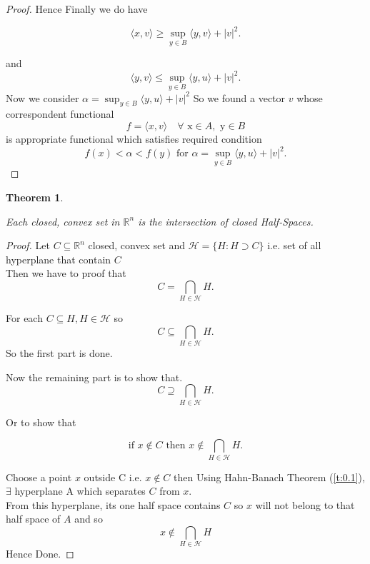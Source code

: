 \documentclass[oneside]{book}
\newtheorem{theorem}{Theorem}[section]
\begin{document}
\begin{proof}
		Hence Finally we do have 
		
		\begin{equation}
		\label{eq4.2}
		\langle x, v \rangle \geqslant\sup_{y\in B}\langle y, v\rangle+|v|^{2}.
		\end{equation}
		
		
		and 
		\begin{equation}
		\langle y, v\rangle  \leqslant \sup _{y \in B}\langle y, u\rangle + |v|^{2}.
		\end{equation}
		Now we consider  $\alpha =  \sup _{y \in B}\langle y, u\rangle + |v|^{2}$ 
		So we found a vector $v$ whose \\
		correspondent functional 
		\\ $$f = \langle x, v\rangle \quad  
		\forall \text{ x} \in A, \text{ y} \in B $$ is 
		appropriate functional which satisfies required condition 
		$$f(x)< \alpha < f(y)
		\text{ for } 
		\alpha =  \sup _{y \in B}\langle y, u\rangle + |v|^{2}.$$
	\end{proof}
	
	
	
	
	
	
	\begin{theorem}
		\label{t:0.2}
		
		Each closed, convex set in  $\mathbb{R}^{n}$ is the intersection of closed Half-Spaces.
		
	\end{theorem}
	
	
	
	
	
	\begin{proof}
		
		
		
		
		
		Let 
		$ C\subseteq \mathbb{R}^{n}$ closed, convex set and $\mathcal{H}=\{H: H\supset C\}$ i.e. set of all hyperplane that contain $C$ \\
		Then we have to proof that
		$$ C = \bigcap_{H \in \mathcal{H}} H. $$
		
		
		For each $ C \subseteq  H, H \in \mathcal{H}$ so 
		$$ C \subseteq \bigcap_{ H \in \mathcal{H}} H. $$
		So the first part is done.
		\hfill \break
		
		Now the remaining part is to show that.
		$$ C \supseteq \bigcap_{ H \in \mathcal{H}} H. $$
		
		
		Or to show that 
		
		$$\text{if }  x \notin C \text { then } x \notin \bigcap_{H \in \mathcal{H}} H. $$
		
		
		
		Choose a point $x$ outside C  i.e. $x \notin C$
		then Using Hahn-Banach Theorem (\ref{t:0.1}), $\exists$ hyperplane A which separates $C$ from $x$.\\
		From this hyperplane, its one half space contains $C$ so $x$ will not belong to that half space of $A$ and so 
		$$ x \notin \bigcap_{H \in \mathcal{H}} H $$
		Hence Done.
		
	\end{proof}
	
\end{document}
